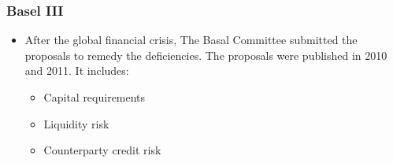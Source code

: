 \begin{itemize}
\end{itemize}



\subsubsection{Basel III}
\begin{itemize}
\item After the global financial crisis, The Basal Committee submitted the proposals to remedy the deficiencies. The proposals were published in 2010 and 2011. It includes:
    \begin{itemize}
    \item Capital requirements
    \item Liquidity risk
    \item Counterparty credit risk
    \end{itemize}
\end{itemize}



